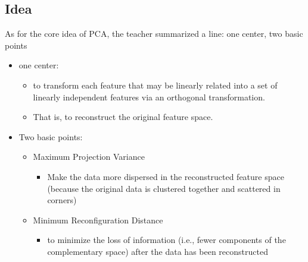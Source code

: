\documentclass{report}
\begin{document}
\subsection{Idea}
As for the core idea of PCA, the teacher summarized a line: one center, two basic points
\begin{itemize}
	\item one center:
	\begin{itemize}
	\item to transform each feature that may be linearly related into a set of linearly independent features via an orthogonal transformation.
	\item That is, to reconstruct the original feature space.
	\end{itemize}
	\item Two basic points:
	\begin{itemize}
	\item Maximum Projection Variance
	\begin{itemize}
	\item Make the data more dispersed in the reconstructed feature space (because the original data is clustered together and scattered in corners)
	\end{itemize}
	\item Minimum Reconfiguration Distance
	\begin{itemize}
	\item to minimize the loss of information (i.e., fewer components of the complementary space) after the data has been reconstructed
	\end{itemize}
	\end{itemize}
\end{itemize}
\end{document}
